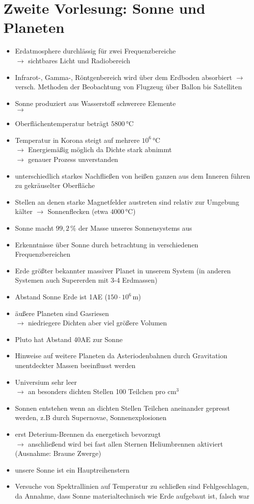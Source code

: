 \section{Zweite Vorlesung: Sonne und Planeten}
\begin{itemize}
\item Erdatmosphere durchlässig für zwei Frequenzbereiche\\
$\longrightarrow$ sichtbares Licht und Radiobereich
\item Infrarot-, Gamma-, Röntgenbereich wird über dem Erdboden absorbiert
$\longrightarrow$ versch. Methoden der Beobachtung von Flugzeug über Ballon bis Satelliten
\item Sonne produziert aus Wasserstoff schwerere Elemente\\
$\longrightarrow$
\item Oberflächentemperatur beträgt $5800\,\text{°C}$
\item Temperatur in Korona steigt auf mehrere $10^6\,\text{°C}$\\
$\longrightarrow$ Energiemäßig möglich da Dichte stark abnimmt\\
$\longrightarrow$ genauer Prozess unverstanden
\item unterschiedlich starkes Nachfließen von heißen ganzen aus dem Inneren führen zu gekräuselter Oberfläche
\item Stellen an denen starke Magnetfelder austreten sind relativ zur Umgebung kälter
$\longrightarrow$ Sonnenflecken (etwa $4000\,\text{°C}$)
\item Sonne macht $99,2\,\%$ der Masse unseres Sonnensystems aus
\item Erkenntnisse über Sonne durch betrachtung in verschiedenen Frequenzbereichen
\item Erde größter bekannter massiver Planet in unserem System (in anderen Systemen auch Supererden mit 3-4 Erdmassen)
\item Abstand Sonne Erde ist 1AE ($150\cdot 10^6\,\text{m}$)
\item äußere Planeten sind Gasriesen\\
$\longrightarrow$ niedriegere Dichten aber viel größere Volumen
\item Pluto hat Abstand 40AE zur Sonne
\item Hinweise auf weitere Planeten da Asteriodenbahnen durch Gravitation unentdeckter Massen beeinflusst werden
\item Universium sehr leer\\
$\longrightarrow$ an besonders dichten Stellen 100 Teilchen pro $\text{cm}^3$
\item Sonnen entstehen wenn an dichten Stellen Teilchen aneinander gepresst werden, z.B durch Supernovae, Sonnenexplosionen
\item erst Deterium-Brennen da energetisch bevorzugt\\
$\longrightarrow$ anschließend wird bei fast allen Sternen Heliumbrennen aktiviert (Ausnahme: Braune Zwerge)
\item unsere Sonne ist ein Hauptreihenstern
\item Versuche von Spektrallinien auf Temperatur zu schließen sind Fehlgeschlagen, da Annahme, dass Sonne materialtechnisch wie Erde aufgebaut ist, falsch war


\end{itemize}
